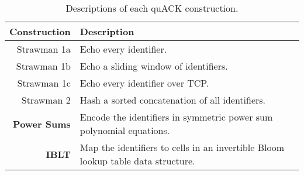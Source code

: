 \begin{table}[t]
  \centering
  \begin{tabular}{rl}
    \toprule
    \bf Construction & \bf Description \\
    \midrule
    Strawman 1a & Echo every identifier. \\
    Strawman 1b & Echo a sliding window of identifiers. \\
    Strawman 1c & Echo every identifier over TCP. \\
    Strawman 2 & Hash a sorted concatenation of all identifiers.\\
    \bf \textcolor{black!50!blue}{Power Sums} & \textcolor{black!50!blue}{Encode the identifiers in symmetric power sum polynomial equations.} \\
    \bf \textcolor{black!50!blue}{IBLT} & \textcolor{black!50!blue}{Map the identifiers to cells in an invertible Bloom lookup table data structure.} \\
    \bottomrule
  \end{tabular}
  \caption{
  Descriptions of each quACK construction.
  }
  \label{tab:quack:constructions}
\end{table}
